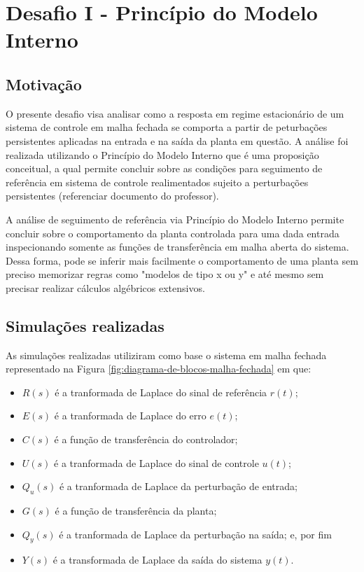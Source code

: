 \section{Desafio I - Princípio do Modelo Interno}

\subsection{Motivação}
O presente desafio visa analisar como a resposta em regime estacionário de um
sistema de controle em malha fechada se comporta a partir de peturbações
persistentes aplicadas na entrada e na saída da planta em questão. A análise foi
realizada utilizando o Princípio do Modelo Interno que é uma proposição
conceitual, a qual permite concluir sobre as condições para seguimento de
referência em sistema de controle realimentados sujeito a perturbações
persistentes (referenciar documento do professor).

A análise de seguimento de referência via Princípio do Modelo Interno permite
concluir sobre o comportamento da planta controlada para uma dada entrada
inspecionando somente as funções de transferência em malha aberta do sistema.
Dessa forma, pode se inferir mais facilmente o comportamento de uma planta sem
preciso memorizar regras como "modelos de tipo x ou y" e até mesmo sem precisar
realizar cálculos algébricos extensivos.

\subsection{Simulações realizadas}
\label{sec:simulacao-realizadas}
As simulações realizadas utiliziram como base o sistema em malha fechada
representado na Figura \ref{fig:diagrama-de-blocos-malha-fechada} em que:
\begin{itemize}
    \item $R(s)$ é a tranformada de Laplace do sinal de referência $r(t)$;
    \item $E(s)$ é a tranformada de Laplace do erro $e(t)$;
    \item $C(s)$ é a função de transferência do controlador;
    \item $U(s)$ é a tranformada de Laplace do sinal de controle $u(t)$;
    \item $Q_{u}(s)$ é a tranformada de Laplace da perturbação de entrada;
    \item $G(s)$ é a função de transferência da planta;
    \item $Q_{y}(s)$ é a tranformada de Laplace da perturbação na saída; e,
    por fim
    \item $Y(s)$ é a transformada de Laplace da saída do sistema $y(t)$.
\end{itemize}

